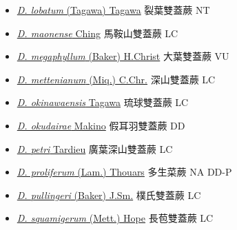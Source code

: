 \begin{itemize}
\begin{itemize}
        \item[] \href{http://www.theplantlist.org/tpl1.1/search?q=Diplazium+lobatum}{\textit{D. lobatum} (Tagawa) Tagawa}   裂葉雙蓋蕨 NT
        \item[] \href{http://www.theplantlist.org/tpl1.1/search?q=Diplazium+maonense}{\textit{D. maonense} Ching}   馬鞍山雙蓋蕨 LC
        \item[] \href{http://www.theplantlist.org/tpl1.1/search?q=Diplazium+megaphyllum}{\textit{D. megaphyllum} (Baker) H.Christ}   大葉雙蓋蕨 VU
        \item[] \href{http://www.theplantlist.org/tpl1.1/search?q=Diplazium+mettenianum}{\textit{D. mettenianum} (Miq.) C.Chr.}   深山雙蓋蕨 LC
        \item[] \href{http://www.theplantlist.org/tpl1.1/search?q=Diplazium+okinawaensis}{\textit{D. okinawaensis} Tagawa}   琉球雙蓋蕨 LC
        \item[] \href{http://www.theplantlist.org/tpl1.1/search?q=Diplazium+okudairae}{\textit{D. okudairae} Makino}   假耳羽雙蓋蕨 DD
        \item[] \href{http://www.theplantlist.org/tpl1.1/search?q=Diplazium+petri}{\textit{D. petri} Tardieu}   廣葉深山雙蓋蕨 LC
        \item[] \href{http://www.theplantlist.org/tpl1.1/search?q=Diplazium+proliferum}{\textit{D. proliferum} (Lam.) Thouars}   多生菜蕨 NA DD-P
        \item[] \href{http://www.theplantlist.org/tpl1.1/search?q=Diplazium+pullingeri}{\textit{D. pullingeri} (Baker) J.Sm.}   樸氏雙蓋蕨 LC
        \item[] \href{http://www.theplantlist.org/tpl1.1/search?q=Diplazium+squamigerum}{\textit{D. squamigerum} (Mett.) Hope}   長苞雙蓋蕨 LC

\end{itemize}
\end{itemize}
